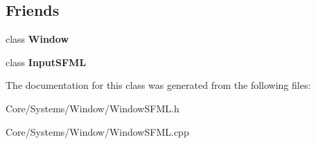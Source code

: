 \subsection*{Friends}
\begin{DoxyCompactItemize}
\item 
\hypertarget{classDCEngine_1_1Systems_1_1WindowSFML_a553f958a25683445088050a69d3de8e9}{class {\bfseries Window}}\label{classDCEngine_1_1Systems_1_1WindowSFML_a553f958a25683445088050a69d3de8e9}

\item 
\hypertarget{classDCEngine_1_1Systems_1_1WindowSFML_a75463b7fc04ee0ed91ae84990048dce6}{class {\bfseries Input\-S\-F\-M\-L}}\label{classDCEngine_1_1Systems_1_1WindowSFML_a75463b7fc04ee0ed91ae84990048dce6}

\end{DoxyCompactItemize}


The documentation for this class was generated from the following files\-:\begin{DoxyCompactItemize}
\item 
Core/\-Systems/\-Window/Window\-S\-F\-M\-L.\-h\item 
Core/\-Systems/\-Window/Window\-S\-F\-M\-L.\-cpp\end{DoxyCompactItemize}

